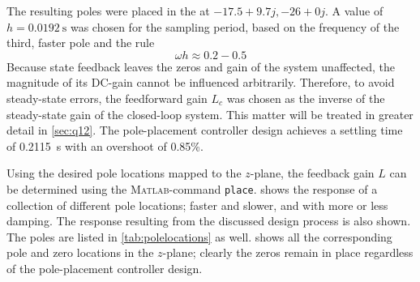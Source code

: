 The resulting poles were placed in the at $-17.5 + 9.7j, -26 + 0j$. A value of $h = \SI{0.0192}{\second}$ was chosen for the sampling period, based on the frequency of the third, faster pole and the rule \cite{astrom}
    $$ \omega h \approx 0.2-0.5 $$
Because state feedback leaves the zeros and gain of the system unaffected, the magnitude of its DC-gain cannot be influenced arbitrarily. Therefore, to avoid steady-state errors, the feedforward gain $L_c$ was chosen as the inverse of the steady-state gain of the closed-loop system. This matter will be treated in greater detail in \cref{sec:q12}.
The pole-placement controller design achieves a settling time of \SI{0.2115}{\second} with an overshoot of 0.85\%.

Using the desired pole locations mapped to the $z$-plane, the feedback gain $L$ can be determined using the \textsc{Matlab}-command \texttt{place}.  shows the response of a collection of different pole locations; faster and slower, and with more or less damping. The response resulting from the discussed design process is also shown. The poles are listed in \cref{tab:polelocations} as well.  shows all the corresponding pole and zero locations in the $z$-plane; clearly the zeros remain in place regardless of the pole-placement controller design.
